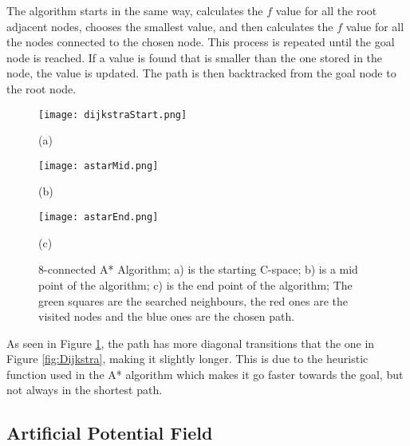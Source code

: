 The algorithm starts in the same way, calculates the $f$ value for all the root adjacent nodes, chooses the smallest value,
and then calculates the $f$ value for all the nodes connected to the chosen node. This process is repeated until the goal 
node is reached. If a value is found that is smaller than the one stored in the node, the value is updated. The path is then 
backtracked from the goal node to the root node.
\begin{figure}[htbp]
    \centering
    \begin{minipage}[b]{0.3\textwidth}
        \centering
        \texttt{[image: dijkstraStart.png]} %
        \caption*{(a)}
    \end{minipage}
    \begin{minipage}[b]{0.3\textwidth}
        \centering
        \texttt{[image: astarMid.png]} %
        \caption*{(b)}
    \end{minipage}
    \begin{minipage}[b]{0.3\textwidth}
        \centering
        \texttt{[image: astarEnd.png]} %
        \caption*{(c)}
    \end{minipage}
    \caption{8-connected A* Algorithm; a) is the starting C-space; b) is a mid point of the algorithm; c) is the end point of the algorithm; The green squares are the searched neighbours, the red ones are the visited nodes and the blue ones are the chosen path.}
    \label{fig:A*}
\end{figure}

As seen in Figure \ref{fig:A*}, the path has more diagonal transitions that the one in 
Figure \ref{fig:Dijkstra}, making it slightly longer. This is due to the heuristic function used in the A* algorithm which 
makes it go faster towards the goal, but not always in the shortest path.

\subsection{Artificial Potential Field}
\label{subsec:APF}
